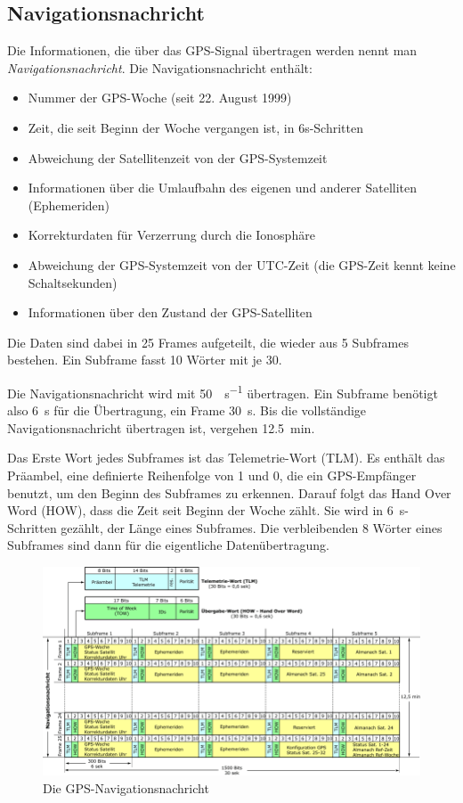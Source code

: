 \documentclass[12pt,a4paper]{scrartcl}
\begin{document}
\subsection{Navigationsnachricht}
Die Informationen, die über das GPS-Signal übertragen werden nennt man \emph{Navigationsnachricht}. Die Navigationsnachricht enthält:
\begin{itemize}
\item Nummer der GPS-Woche (seit 22. August 1999)
\item Zeit, die seit Beginn der Woche vergangen ist, in 6s-Schritten
\item Abweichung der Satellitenzeit von der GPS-Systemzeit
\item Informationen über die Umlaufbahn des eigenen und anderer Satelliten (Ephemeriden)
\item Korrekturdaten für Verzerrung durch die Ionosphäre
\item Abweichung der GPS-Systemzeit von der UTC-Zeit (die GPS-Zeit kennt keine Schaltsekunden)
\item Informationen über den Zustand der GPS-Satelliten
\end{itemize}
\cite{infotip_gps}

Die Daten sind dabei in 25 Frames aufgeteilt, die wieder aus 5 Subframes bestehen. Ein Subframe fasst 10 Wörter mit je \SI{30}{\bit}.

Die Navigationsnachricht wird mit \SI{50}{\bit\per\second} übertragen.
Ein Subframe benötigt also \SI{6}{\second} für die Übertragung, ein Frame \SI{30}{\second}. Bis die vollständige Navigationsnachricht übertragen ist, vergehen \SI{12.5}{\minute}.

Das Erste Wort jedes Subframes ist das Telemetrie-Wort (TLM). Es enthält das Präambel, eine definierte Reihenfolge von 1 und 0, die ein GPS-Empfänger benutzt, um den Beginn des Subframes zu erkennen.  Darauf folgt das Hand Over Word (HOW), dass die Zeit seit Beginn der Woche zählt. Sie wird in \SI{6}{\second}-Schritten gezählt, der Länge eines Subframes. Die verbleibenden 8 Wörter eines Subframes sind dann für die eigentliche Datenübertragung.

\begin{figure}[H]
\centering
\includegraphics[width=\textwidth]{img/navigation_message.png}
\caption{Die GPS-Navigationsnachricht\cite{infotip_gps}}
\label{fig:nm}
\end{figure}
\end{document}
